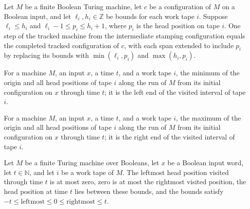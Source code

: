 \begin{lemma}
\label{Turing.FinTM.emCall_track_stamp}
\leanok
{}
Let $M$ be a finite Boolean Turing machine, let $c$ be a configuration of $M$ on a
Boolean input, and let $\ell_i,h_i\in\mathbb{Z}$ be bounds for each work tape $i$.
Suppose $\ell_i\le h_i$ and $\ell_i-1\le p_i\le h_i+1$, where $p_i$ is the head position
on tape $i$. One step of the tracked machine from the intermediate stamping
configuration equals the completed tracked configuration of $c$, with each span extended
to include $p_i$ by replacing its bounds with $\min(\ell_i,p_i)$ and $\max(h_i,p_i)$.
\end{lemma}

\begin{definition}
\label{Turing.FinTM.emCallLo}
\leanok
{}
For a machine $M$, an input $x$, a time $t$, and a work tape $i$, the minimum of the
origin and all head positions of tape $i$ along the run of $M$ from its initial
configuration on $x$ through time $t$; it is the left end of the visited interval of
tape $i$.
\end{definition}

\begin{definition}
\label{Turing.FinTM.emCallHi}
\leanok
{}
For a machine $M$, an input $x$, a time $t$, and a work tape $i$, the maximum of the
origin and all head positions of tape $i$ along the run of $M$ from its initial
configuration on $x$ through time $t$; it is the right end of the visited interval of
tape $i$.
\end{definition}

\begin{lemma}
\label{Turing.FinTM.emCall_track_extent}
\leanok
{}
Let $M$ be a finite Turing machine over Booleans, let $x$ be a Boolean input word, let
$t\in\mathbb{N}$, and let $i$ be a work tape of $M$. The leftmost head position visited
through time $t$ is at most zero, zero is at most the rightmost visited position, the
head position at time $t$ lies between these bounds, and the bounds satisfy $-t\le
\mathrm{leftmost}\le 0\le \mathrm{rightmost}\le t$.
\end{lemma}

